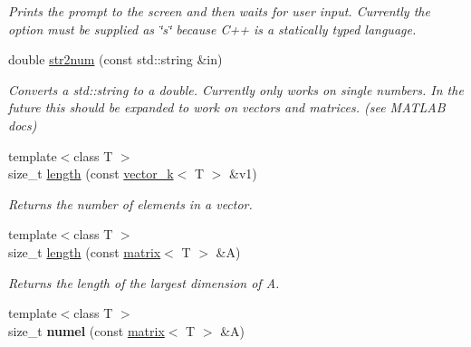 \begin{DoxyCompactItemize}
\begin{DoxyCompactList}\small\item\em Prints the prompt to the screen and then waits for user input. Currently the option must be supplied as \char`\"{}s\char`\"{} because C++ is a statically typed language. \end{DoxyCompactList}\item 
\hypertarget{namespacekeycpp_a4bca7924aad17a920f2f5f0606e6d9a9}{double \hyperlink{namespacekeycpp_a4bca7924aad17a920f2f5f0606e6d9a9}{str2num} (const std\-::string \&in)}\label{namespacekeycpp_a4bca7924aad17a920f2f5f0606e6d9a9}

\begin{DoxyCompactList}\small\item\em Converts a std\-::string to a double. Currently only works on single numbers. In the future this should be expanded to work on vectors and matrices. (see M\-A\-T\-L\-A\-B docs) \end{DoxyCompactList}\item 
\hypertarget{namespacekeycpp_aa605bad9095a6c529656926dc4fb35cf}{{\footnotesize template$<$class T $>$ }\\size\-\_\-t \hyperlink{namespacekeycpp_aa605bad9095a6c529656926dc4fb35cf}{length} (const \hyperlink{classkeycpp_1_1vector__k}{vector\-\_\-k}$<$ T $>$ \&v1)}\label{namespacekeycpp_aa605bad9095a6c529656926dc4fb35cf}

\begin{DoxyCompactList}\small\item\em Returns the number of elements in a vector. \end{DoxyCompactList}\item 
\hypertarget{namespacekeycpp_a9c30ad952d4422425a171c12bdf33947}{{\footnotesize template$<$class T $>$ }\\size\-\_\-t \hyperlink{namespacekeycpp_a9c30ad952d4422425a171c12bdf33947}{length} (const \hyperlink{classkeycpp_1_1matrix}{matrix}$<$ T $>$ \&A)}\label{namespacekeycpp_a9c30ad952d4422425a171c12bdf33947}

\begin{DoxyCompactList}\small\item\em Returns the length of the largest dimension of A. \end{DoxyCompactList}\item 
\hypertarget{namespacekeycpp_adcbcd3d38aa0721f2556422eb06cad7d}{{\footnotesize template$<$class T $>$ }\\size\-\_\-t {\bfseries numel} (const \hyperlink{classkeycpp_1_1matrix}{matrix}$<$ T $>$ \&A)}\label{namespacekeycpp_adcbcd3d38aa0721f2556422eb06cad7d}


\end{DoxyCompactItemize}
